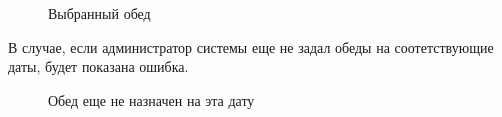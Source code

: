 \documentclass[a4paper]{article}
\begin{document}
\begin{figure}[h!]
\caption{Выбранный обед}
\label{fig:image30}
\end{figure}

В случае, если администратор системы еще не задал обеды на соотетствующие даты, будет показана ошибка.

\begin{figure}[h!]
\caption{Обед еще не назначен на эта дату}
\label{fig:image31}
\end{figure}
\end{document}
